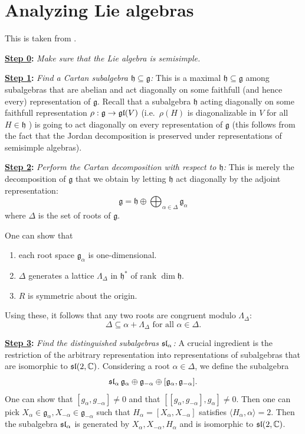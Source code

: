 \documentclass{report}
\begin{document}
\chapter{Analyzing Lie algebras}
This is taken from \cite[§14]{fulton2013representation}.

{\bf \underline{Step 0}:} \emph{Make sure that the Lie algebra is semisimple.}

{\bf \underline{Step 1}:} \emph{Find a Cartan subalgebra $\mathfrak h \subseteq \mathfrak g$:}
This is a maximal $\mathfrak h \subseteq \mathfrak g$ among subalgebras that are abelian and act diagonally on some faithfull (and hence every) representation of $\mathfrak g$.
Recall that a subalgebra $\mathfrak h$ acting diagonally on some faithfull representation $\rho: \mathfrak g \to \operatorname{{\mathfrak{gl}}}(V)$ (i.e.\ $\rho(H)$ is diagonalizable in $V$ for all $H \in \mathfrak h$ ) is going to act diagonally on every representation of $\mathfrak g$ (this follows from the fact that the Jordan decomposition is preserved under representations of semisimple algebras).

{\bf \underline{Step 2}:} \emph{Perform the Cartan decomposition with respect to $\mathfrak h$:}
This is merely the decomposition of $\mathfrak g$ that we obtain by letting $\mathfrak h$ act diagonally by the adjoint representation:
\[
\mathfrak g = \mathfrak h \oplus \bigoplus_{\alpha \in \Delta} \mathfrak g_\alpha
\]
where $\Delta$ is the set of roots of $\mathfrak g$.

One can show that
\begin{enumerate}[label = (\roman*)]
    \item each root space $\mathfrak g_\alpha$ is one-dimensional.
    \item $\Delta$ generates a lattice $\Lambda_\Delta$ in $\mathfrak h^*$ of rank $\dim \mathfrak h$.
    \item $R$ is symmetric about the origin.
\end{enumerate}
Using these, it follows that any two roots are congruent modulo $\Lambda_\Delta$:
\[
\Delta \subseteq \alpha + \Lambda_\Delta \text{ for all } \alpha \in \Delta.
\]

{\bf \underline{Step 3}:} \emph{Find the distinguished subalgebras $\operatorname{{\mathfrak{sl}}}_\alpha$:}
A crucial ingredient is the restriction of the arbitrary representation into representations of subalgebras that are isomorphic to $\operatorname{{\mathfrak{sl}}}(2, \mathbb C)$.
Considering a root $\alpha \in \Delta$, we define the subalgebra
\[
\operatorname{{\mathfrak{sl}}}_\alpha \mathfrak g_\alpha \oplus \mathfrak g_{-\alpha} \oplus [\mathfrak g_\alpha, \mathfrak g_{-\alpha}].
\]
One can show that $[g_\alpha, g_{-\alpha}] \neq 0$ and that $[[g_\alpha, g_{-\alpha}], g_\alpha] \neq 0$.
Then one can pick $X_\alpha \in \mathfrak g_\alpha, X_{-\alpha} \in \mathfrak g_{-\alpha}$ such that $H_\alpha = [X_\alpha, X_{-\alpha}]$ satisfies $\langle H_\alpha, \alpha \rangle = 2$.
Then the subalgebra $\operatorname{{\mathfrak{sl}}}_\alpha$ is generated by $X_\alpha, X_{-\alpha}, H_\alpha$ and is isomorphic to $\operatorname{{\mathfrak{sl}}}(2, \mathbb C)$.
\end{document}
